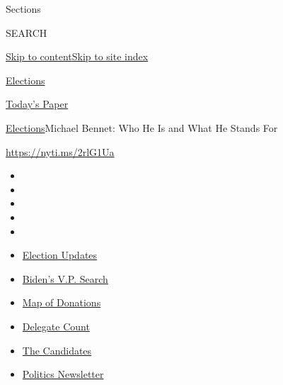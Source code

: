 Sections

SEARCH

\protect\hyperlink{site-content}{Skip to
content}\protect\hyperlink{site-index}{Skip to site index}

\href{https://www.nytimes.com/news-event/2020-election}{Elections}

\href{https://myaccount.nytimes.com/auth/login?response_type=cookie\&client_id=vi}{}

\href{https://www.nytimes.com/section/todayspaper}{Today's Paper}

\href{/news-event/2020-election}{Elections}\textbar{}Michael Bennet: Who
He Is and What He Stands For

\url{https://nyti.ms/2rlG1Ua}

\begin{itemize}
\item
\item
\item
\item
\item
\end{itemize}

\begin{itemize}
\item
  \href{https://www.nytimes.com/2020/07/31/us/elections/biden-vs-trump.html?action=click\&pgtype=Article\&state=default\&region=TOP_BANNER\&context=storylines_menu}{Election
  Updates}
\item
  \href{https://www.nytimes.com/article/biden-vice-president-2020.html?action=click\&pgtype=Article\&state=default\&region=TOP_BANNER\&context=storylines_menu}{Biden's
  V.P. Search}
\item
  \href{https://www.nytimes.com/interactive/2020/07/24/us/politics/trump-biden-campaign-donors.html?action=click\&pgtype=Article\&state=default\&region=TOP_BANNER\&context=storylines_menu}{Map
  of Donations}
\item
  \href{https://www.nytimes.com/interactive/2020/us/elections/delegate-count-primary-results.html?action=click\&pgtype=Article\&state=default\&region=TOP_BANNER\&context=storylines_menu}{Delegate
  Count}
\item
  \href{https://www.nytimes.com/interactive/2019/us/politics/2020-presidential-candidates.html?action=click\&pgtype=Article\&state=default\&region=TOP_BANNER\&context=storylines_menu}{The
  Candidates}
\item
  \href{https://www.nytimes.com/newsletters/politics?action=click\&pgtype=Article\&state=default\&region=TOP_BANNER\&context=storylines_menu}{Politics
  Newsletter}
\end{itemize}

